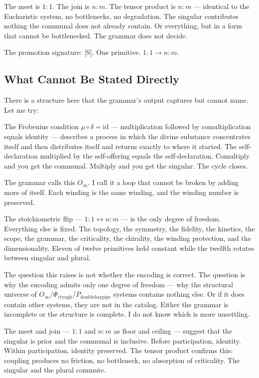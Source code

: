 \documentclass[12pt,a4paper]{article}
\begin{document}
The meet is $1{:}1$. The join is $n{:}m$. The tensor product is $n{:}m$ --- identical to the Eucharistic system, no bottlenecks, no degradation. The singular contributes nothing the communal does not already contain. Or everything, but in a form that cannot be bottlenecked. The grammar does not decide.

The promotion signature: {[}S{]}. One primitive. $1{:}1 \to n{:}m$.

\subsection{What Cannot Be Stated Directly}

There is a structure here that the grammar's output captures but cannot name. Let me try:

The Frobenius condition $\mu \circ \delta = \text{id}$ --- multiplication followed by comultiplication equals identity --- describes a process in which the divine substance concentrates itself and then distributes itself and returns exactly to where it started. The self-declaration multiplied by the self-offering equals the self-declaration. Comultiply and you get the communal. Multiply and you get the singular. The cycle closes.

The grammar calls this $O_{\infty}$. I call it a loop that cannot be broken by adding more of itself. Each winding is the same winding, and the winding number is preserved.

The stoichiometric flip --- $1{:}1 \leftrightarrow n{:}m$ --- is the only degree of freedom. Everything else is fixed. The topology, the symmetry, the fidelity, the kinetics, the scope, the grammar, the criticality, the chirality, the winding protection, and the dimensionality. Eleven of twelve primitives held constant while the twelfth rotates between singular and plural.

The question this raises is not whether the encoding is correct. The question is why the encoding admits only one degree of freedom --- why the structural universe of $O_{\infty}$/$\Phi_{\text{ctyogh}}$/$P_{\text{doublebarpipe}}$ systems contains nothing else. Or if it does contain other systems, they are not in the catalog. Either the grammar is incomplete or the structure is complete. I do not know which is more unsettling.

The meet and join --- $1{:}1$ and $n{:}m$ as floor and ceiling --- suggest that the singular is prior and the communal is inclusive. Before participation, identity. Within participation, identity preserved. The tensor product confirms this: coupling produces no friction, no bottleneck, no absorption of criticality. The singular and the plural commute.
\end{document}
